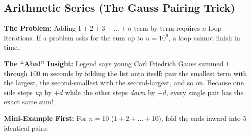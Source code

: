 \documentclass[11pt,a4paper]{article}
\theoremstyle{definition}
\newcommand{\painbeat}{\textbf{\color{accentamber}The Problem:} }
\newcommand{\ahabeat}{\textbf{\color{accentteal}The ``Aha!'' Insight:} }
\newcommand{\examplebeat}{\textbf{\color{primaryblue}Mini-Example First:} }
\begin{document}
\subsection{Arithmetic Series (The Gauss Pairing Trick)}

\painbeat Adding $1 + 2 + 3 + \dots + n$ term by term requires $n$ loop iterations. If a problem asks for the sum up to $n = 10^9$, a loop cannot finish in time.

\ahabeat Legend says young Carl Friedrich Gauss summed $1$ through $100$ in seconds by folding the list onto itself: pair the smallest term with the largest, the second-smallest with the second-largest, and so on. Because one side steps \emph{up} by $+d$ while the other steps \emph{down} by $-d$, every single pair has the exact same sum!

\examplebeat For $n = 10$ ($1 + 2 + \dots + 10$), fold the ends inward into $5$ identical pairs:
\end{document}

